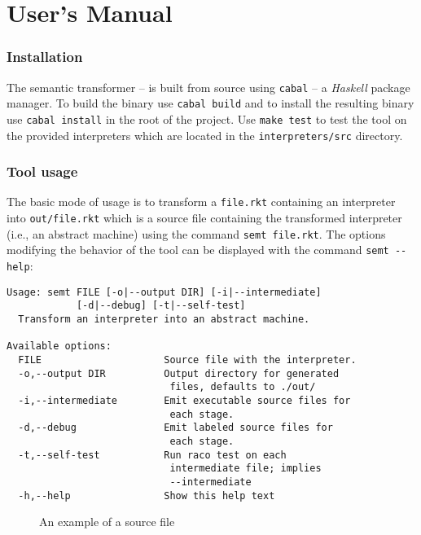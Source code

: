 \chapter{User's Manual}\label{chapter:user-manual}
\subsection*{Installation}
The semantic transformer -- \semt{} is built from source using \lstinline!cabal! -- a \textit{Haskell} package manager.
To build the binary use \lstinline!cabal build! and to install the resulting binary use \lstinline!cabal install! in the root of the project.
Use \lstinline!make test! to test the tool on the provided interpreters which are located in the \lstinline!interpreters/src! directory.

\subsection*{Tool usage}
The basic mode of usage is to transform a \lstinline!file.rkt! containing an interpreter into \lstinline!out/file.rkt! which is a source file containing the transformed interpreter (i.e., an abstract machine) using the command \lstinline!semt file.rkt!.
The options modifying the behavior of the tool can be displayed with the command \lstinline!semt --help!:
\begin{lstlisting}
Usage: semt FILE [-o|--output DIR] [-i|--intermediate] 
            [-d|--debug] [-t|--self-test]
  Transform an interpreter into an abstract machine.

Available options:
  FILE                     Source file with the interpreter.
  -o,--output DIR          Output directory for generated
                            files, defaults to ./out/
  -i,--intermediate        Emit executable source files for
                            each stage.
  -d,--debug               Emit labeled source files for
                            each stage.
  -t,--self-test           Run raco test on each
                            intermediate file; implies
                            --intermediate
  -h,--help                Show this help text
\end{lstlisting}

\begin{figure}
  
  \caption{An example of a source file}
  \label{fig:idl-example}
\end{figure}

